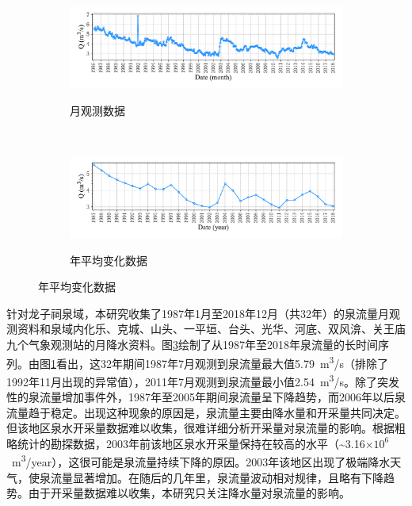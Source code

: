 \begin{figure}[!htbp]
  \centering
  \begin{subfigure}[b]{1.0\textwidth}
    \caption{月观测数据} 
    \vspace{-0.35cm}
    \includegraphics[width=\textwidth]{Img/chap4_spr/spr_discharge_monthly}
    \label{fig:spr_discharge_monthly}
  \end{subfigure}    \\
  \vspace{-1cm}
  \begin{subfigure}[b]{1.0\textwidth}
    \caption{年平均变化数据}
    \vspace{-0.35cm}
    \includegraphics[width=\textwidth]{Img/chap4_spr/spr_discharge_yearly}
    \label{fig:spr_discharge_yearly}
  \end{subfigure}
  \vspace{-2cm}
  \label{fig:spr_discharge}
\end{figure}

针对龙子祠泉域，本研究收集了1987年1月至2018年12月（共32年）的泉流量月观测资料和泉域内化乐、克城、山头、一平垣、台头、光华、河底、双风渰、关王庙九个气象观测站的月降水资料。图\ref{fig:spr_discharge}绘制了从1987年至2018年泉流量的长时间序列。由图\ref{fig:spr_discharge_monthly}看出，这32年期间1987年7月观测到泉流量最大值\SI{5.79}{m^{3}/s}（排除了1992年11月出现的异常值），2011年7月观测到泉流量最小值\SI{2.54}{m^{3}/s}。除了突发性的泉流量增加事件外，1987年至2005年期间泉流量呈下降趋势，而2006年以后泉流量趋于稳定。出现这种现象的原因是，泉流量主要由降水量和开采量共同决定。但该地区泉水开采量数据难以收集，很难详细分析开采量对泉流量的影响。根据粗略统计的勘探数据，2003年前该地区泉水开采量保持在较高的水平（\sim 3.16$\times 10^{6}$\SI{}{m^{3}/year}），这很可能是泉流量持续下降的原因。2003年该地区出现了极端降水天气，使泉流量显著增加。在随后的几年里，泉流量波动相对规律，且略有下降趋势。由于开采量数据难以收集，本研究只关注降水量对泉流量的影响。

